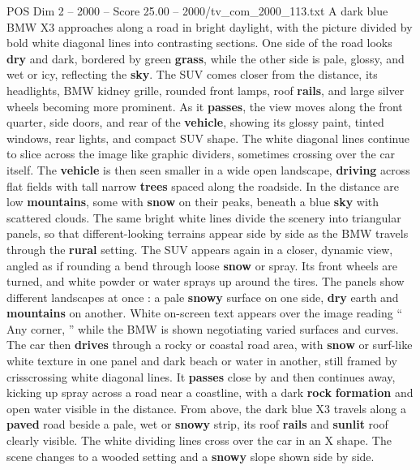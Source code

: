 \begin{textsample}{POS Dim 2 – 2000 – Score 25.00 – 2000/tv\_com\_2000\_113.txt}  \label{ex:f2_pos_024}
A dark blue BMW X3 approaches along a road in bright daylight, with the picture divided by bold white diagonal lines into contrasting sections.
One side of the road looks \textbf{dry} and dark, bordered by green \textbf{grass}, while the other side is pale, glossy, and wet or icy, reflecting the \textbf{sky}.
The SUV comes closer from the distance, its headlights, BMW kidney grille, rounded front lamps, roof \textbf{rails}, and large silver wheels becoming more prominent.
As it \textbf{passes}, the view moves along the front quarter, side doors, and rear of the \textbf{vehicle}, showing its glossy paint, tinted windows, rear lights, and compact SUV shape.
The white diagonal lines continue to slice across the image like graphic dividers, sometimes crossing over the car itself.
The \textbf{vehicle} is then seen smaller in a wide open landscape, \textbf{driving} across flat fields with tall narrow \textbf{trees} spaced along the roadside.
In the distance are low \textbf{mountains}, some with \textbf{snow} on their peaks, beneath a blue \textbf{sky} with scattered clouds.
The same bright white lines divide the scenery into triangular panels, so that different-looking terrains appear side by side as the BMW travels through the \textbf{rural} setting.
The SUV appears again in a closer, dynamic view, angled as if rounding a bend through loose \textbf{snow} or spray.
Its front wheels are turned, and white powder or water sprays up around the tires.
The panels show different landscapes at once : a pale \textbf{snowy} surface on one side, \textbf{dry} earth and \textbf{mountains} on another.
White on-screen text appears over the image reading “ Any corner, ” while the BMW is shown negotiating varied surfaces and curves.
The car then \textbf{drives} through a rocky or coastal road area, with \textbf{snow} or surf-like white texture in one panel and dark beach or water in another, still framed by crisscrossing white diagonal lines.
It \textbf{passes} close by and then continues away, kicking up spray across a road near a coastline, with a dark \textbf{rock} \textbf{formation} and open water visible in the distance.
From above, the dark blue X3 travels along a \textbf{paved} road beside a pale, wet or \textbf{snowy} strip, its roof \textbf{rails} and \textbf{sunlit} roof clearly visible.
The white dividing lines cross over the car in an X shape.
The scene changes to a wooded setting and a \textbf{snowy} slope shown side by side.

\end{textsample}
